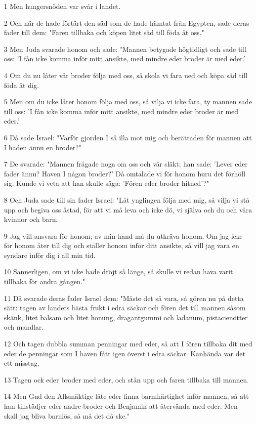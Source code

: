 \par 1 Men hungersnöden var svår i landet.
\par 2 Och när de hade förtärt den säd som de hade hämtat från Egypten, sade deras fader till dem: "Faren tillbaka och köpen litet säd till föda åt oss."
\par 3 Men Juda svarade honom och sade: "Mannen betygade högtidligt och sade till oss: 'I fån icke komma inför mitt ansikte, med mindre eder broder är med eder.'
\par 4 Om du nu låter vår broder följa med oss, så skola vi fara ned och köpa säd till föda åt dig.
\par 5 Men om du icke låter honom följa med oss, så vilja vi icke fara, ty mannen sade till oss: 'I fån icke komma inför mitt ansikte, med mindre eder broder är med eder.'
\par 6 Då sade Israel: "Varför gjorden I så illa mot mig och berättaden för mannen att I haden ännu en broder?"
\par 7 De svarade: "Mannen frågade noga om oss och vår släkt; han sade: 'Lever eder fader ännu? Haven I någon broder?' Då omtalade vi för honom huru det förhöll sig. Kunde vi veta att han skulle säga: 'Fören eder broder hitned'?"
\par 8 Och Juda sade till sin fader Israel: "Låt ynglingen följa med mig, så vilja vi stå upp och begiva oss åstad, för att vi må leva och icke dö, vi själva och du och våra kvinnor och barn.
\par 9 Jag vill ansvara för honom; av min hand må du utkräva honom. Om jag icke för honom åter till dig och ställer honom inför ditt ansikte, så vill jag vara en syndare inför dig i all min tid.
\par 10 Sannerligen, om vi icke hade dröjt så länge, så skulle vi redan hava varit tillbaka för andra gången."
\par 11 Då svarade deras fader Israel dem: "Måste det så vara, så gören nu på detta sätt: tagen av landets bästa frukt i edra säckar och fören det till mannen såsom skänk, litet balsam och litet honung, dragantgummi och ladanum, pistacienötter och mandlar.
\par 12 Och tagen dubbla summan penningar med eder, så att I fören tillbaka dit med eder de penningar som I haven fått igen överst i edra säckar. Kanhända var det ett misstag.
\par 13 Tagen ock eder broder med eder, och stån upp och faren tillbaka till mannen.
\par 14 Men Gud den Allsmäktige låte eder finna barmhärtighet inför mannen, så att han tillstädjer eder andre broder och Benjamin att återvända med eder. Men skall jag bliva barnlös, så må det då ske."

